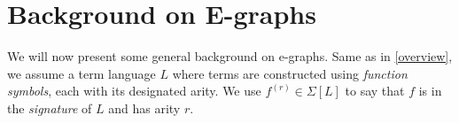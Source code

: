 \section{Background on E-graphs}
\label{background}


We will now present some general background on e-graphs.
Same as in \autoref{overview}, we assume a term language $L$ where terms are constructed using \emph{function symbols}, each with its designated arity.
We use $f^{(r)}\in\Sigma[L]$ to say that $f$ is
in the \emph{signature} of $L$ and has arity $r$.

